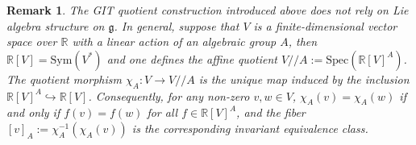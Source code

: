 \documentclass[11pt]{amsart}
\theoremstyle{definition}
\theoremstyle{plain}
\newtheorem{remark}[theorem]{Remark}
\theoremstyle{conclusion}
\begin{document}
 



\begin{remark}
The GIT quotient construction introduced above does not rely on Lie algebra structure on $\mathfrak{g}$. In general, suppose that $V$ is a finite-dimensional  vector space over $\mathbb{R}$ with a linear action of an algebraic group $A$, then $\mathbb{R}[V]=\mathrm{Sym}(V^*)$ and one defines the affine quotient $V//A:=\mathrm{Spec}(\mathbb{R}[V]^A)$. The quotient morphism $\chi_A:V\to V//A$ is the unique map induced by the inclusion $\mathbb{R}[V]^A\hookrightarrow \mathbb{R}[V]$. Consequently, for any non-zero $v,w \in V$, $\chi_A(v)=\chi_A(w)$ if and only if $f(v)=f(w)$ for all $f\in\mathbb{R}[V]^A$, and the fiber $[v]_A:=\chi_A^{-1}(\chi_A(v))$ is the corresponding invariant equivalence class.%
\end{remark}


 
\end{document}
